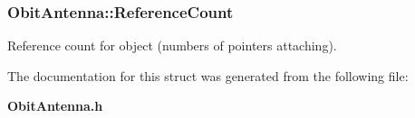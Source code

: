 \subsubsection{ {\bf Obit\-Antenna::Reference\-Count}}\label{structObitAntenna_o2}


Reference count for object (numbers of pointers attaching). 



The documentation for this struct was generated from the following file:\begin{CompactItemize}
\item 
{\bf Obit\-Antenna.h}\end{CompactItemize}
